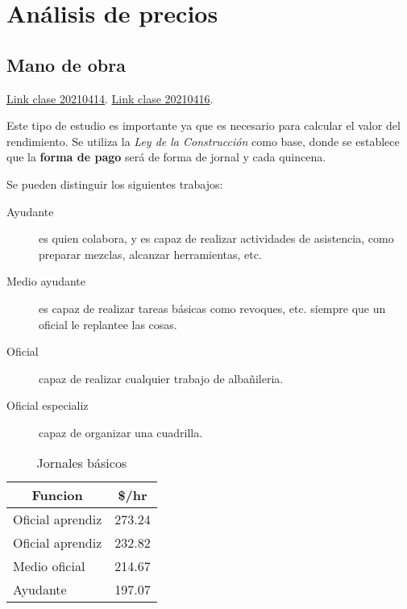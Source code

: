 \documentclass[../main.tex]{subfiles}
\begin{document}
\section{Análisis de precios}

\subsection{Mano de obra }

\href{https://www.youtube.com/watch?v=K7TIwno_aDo}{Link clase 20210414}.
\href{https://www.youtube.com/watch?v=GWOS0LerSx0&list=PLoCwJEKoNRRR7x45YErYqb5XJkEzawFJu&index=7}{Link clase 20210416}.


Este tipo de estudio es importante ya que es necesario para calcular el valor del
rendimiento. Se utiliza la \textit{Ley de la Construcción} como base, donde se
establece que la \textbf{forma de pago} será de forma de jornal y cada quincena.

Se pueden distinguir los siguientes trabajos:

\begin{description}
  \item[Ayudante] es quien colabora, y es capaz de realizar actividades de asistencia,
    como preparar mezclas, alcanzar herramientas, etc.
  \item[Medio ayudante] es capaz de realizar tareas básicas como revoques, etc.
    siempre que un oficial le replantee las cosas.
  \item[Oficial] capaz de realizar cualquier trabajo de albañileria.
  \item[Oficial especializ] capaz de organizar una cuadrilla.
\end{description}

\begin{table}[htbp]
  \centering
  \caption{Jornales básicos}
    \begin{tabular}{|l|r|}
    \hline
    \multicolumn{1}{|c|}{Funcion} & \multicolumn{1}{c|}{\$/hr} \bigstrut\\
    \hline
    Oficial aprendiz & 273.24 \bigstrut\\
    \hline
    Oficial aprendiz & 232.82 \bigstrut\\
    \hline
    Medio oficial & 214.67 \bigstrut\\
    \hline
    Ayudante & 197.07 \bigstrut\\
    \hline
    \end{tabular}%
  \label{tab:addlabel}%
\end{table}%
\end{document}
